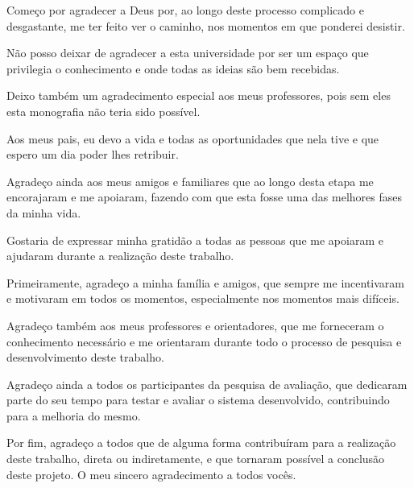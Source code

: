 \documentclass[
	12pt,				%
	openright,			%
	oneside,			%
	a4paper,			%
	english,			%
	french,				%
	spanish,			%
	brazil,				%
	]{abntex2}
\begin{document}
\begin{agradecimentos}

Começo por agradecer a Deus por, ao longo deste processo complicado e desgastante, me ter feito ver o caminho, nos momentos em que ponderei desistir.

Não posso deixar de agradecer a esta universidade por ser um espaço que privilegia o conhecimento e onde todas as ideias são bem recebidas.

Deixo também um agradecimento especial aos meus professores, pois sem eles esta monografia não teria sido possível.

Aos meus pais, eu devo a vida e todas as oportunidades que nela tive e que espero um dia poder lhes retribuir.

Agradeço ainda aos meus amigos e familiares que ao longo desta etapa me encorajaram e me apoiaram, fazendo com que esta fosse uma das melhores fases da minha vida.

Gostaria de expressar minha gratidão a todas as pessoas que me apoiaram e ajudaram durante a realização deste trabalho.

Primeiramente, agradeço a minha família e amigos, que sempre me incentivaram e motivaram em todos os momentos, especialmente nos momentos mais difíceis.

Agradeço também aos meus professores e orientadores, que me forneceram o conhecimento necessário e me orientaram durante todo o processo de pesquisa e desenvolvimento deste trabalho.

Agradeço ainda a todos os participantes da pesquisa de avaliação, que dedicaram parte do seu tempo para testar e avaliar o sistema desenvolvido, contribuindo para a melhoria do mesmo.

Por fim, agradeço a todos que de alguma forma contribuíram para a realização deste trabalho, direta ou indiretamente, e que tornaram possível a conclusão deste projeto. O meu sincero agradecimento a todos vocês.


\end{agradecimentos}


\end{document}
